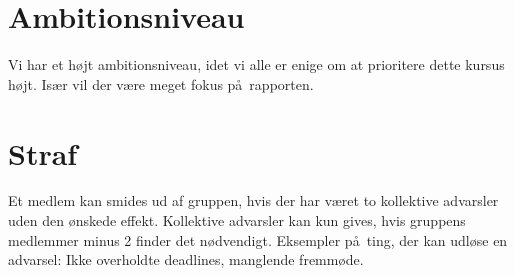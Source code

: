 \documentclass{article}
\begin{document}
\section{Ambitionsniveau}
Vi har et h\o jt ambitionsniveau, idet vi alle er enige om at prioritere dette kursus h\o jt. Is\ae r vil der v\ae re meget fokus p\aa \ rapporten.

\section{Straf}
Et medlem kan smides ud af gruppen, hvis der har v\ae ret to kollektive advarsler uden den \o nskede effekt. Kollektive advarsler kan kun gives, hvis gruppens medlemmer minus 2 finder det n\o dvendigt. Eksempler p\aa \ ting, der kan udl\o se en advarsel: Ikke overholdte deadlines, manglende fremm\o de.
\end{document}
